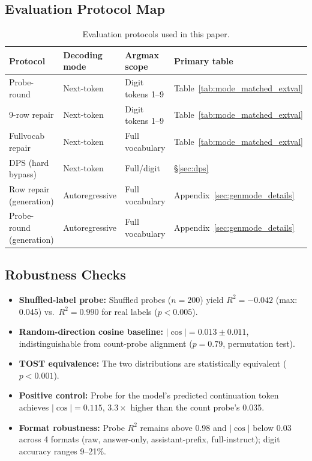 \documentclass{article}
\begin{document}
\subsection{Evaluation Protocol Map}
\label{sec:protocol_map}

\begin{table}[h]
\caption{Evaluation protocols used in this paper.}
\label{tab:protocol_map}
\begin{tabular}{llll}
\toprule
Protocol & Decoding mode & Argmax scope & Primary table \\
\midrule
Probe-round & Next-token & Digit tokens 1--9 & Table~\ref{tab:mode_matched_extval} \\
9-row repair & Next-token & Digit tokens 1--9 & Table~\ref{tab:mode_matched_extval} \\
Fullvocab repair & Next-token & Full vocabulary & Table~\ref{tab:mode_matched_extval} \\
DPS (hard bypass) & Next-token & Full/digit & \S\ref{sec:dps} \\
Row repair (generation) & Autoregressive & Full vocabulary & Appendix~\ref{sec:genmode_details} \\
Probe-round (generation) & Autoregressive & Full vocabulary & Appendix~\ref{sec:genmode_details} \\
\bottomrule
\end{tabular}
\end{table}

\subsection{Robustness Checks}
\label{sec:robustness_checks}

\begin{itemize}
\item \textbf{Shuffled-label probe:} Shuffled probes ($n{=}200$) yield $R^2 =
  -0.042$ (max: 0.045) vs.\ $R^2 = 0.990$ for real labels ($p < 0.005$).
\item \textbf{Random-direction cosine baseline:} $|\cos| = 0.013 \pm 0.011$,
  indistinguishable from count-probe alignment ($p = 0.79$, permutation test).
\item \textbf{TOST equivalence:} The two distributions are statistically
  equivalent ($p < 0.001$).
\item \textbf{Positive control:} Probe for the model's predicted continuation
  token achieves $|\cos| = 0.115$, $3.3\times$ higher than the count probe's
  0.035.
\item \textbf{Format robustness:} Probe $R^2$ remains above 0.98 and $|\cos|$
  below 0.03 across 4 formats (raw, answer-only, assistant-prefix,
  full-instruct); digit accuracy ranges 9--21\%.
\end{itemize}
\end{document}
